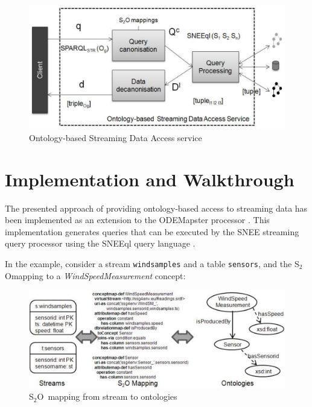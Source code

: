 \documentclass[runningheads,a4paper]{llncs}
\newcommand{\subscript}[1]{\ensuremath{_{\textrm{#1}}}}
\newcommand{\stwoo}{\textsf{S\subscript{2}O}}
\begin{document}
\begin{figure}[here]
\vspace{-20pt} \hspace{20pt}
\begin{center}
\includegraphics[width=8 cm]{img/approach}
\end{center}
\vspace{-10pt} \caption{Ontology-based Streaming Data Access service} \label{fig:SemanticIntegrator} \vspace{-20pt}
\end{figure}



\section{Implementation and Walkthrough}
\label{execution}

The presented approach of providing ontology-based access to streaming data has been implemented as an extension to the
ODEMapster processor \cite{Barrasa_04}. This implementation generates queries that can be executed by the SNEE streaming query processor using the SNEEql query language \cite{Brenninkmeijer_08}.

In the example, consider a stream \texttt{windsamples} and a table \texttt{sensors}, and the \stwoo mapping to a \textit{WindSpeedMeasurement} concept:

\begin{figure}[here]
\vspace{-20pt} \hspace{20pt}
\includegraphics[width=10 cm]{img/mapping}
\vspace{-10pt} \caption{\stwoo\ mapping from stream to ontologies} \label{fig:Mappings} \vspace{-10pt}
\end{figure}
\end{document}
